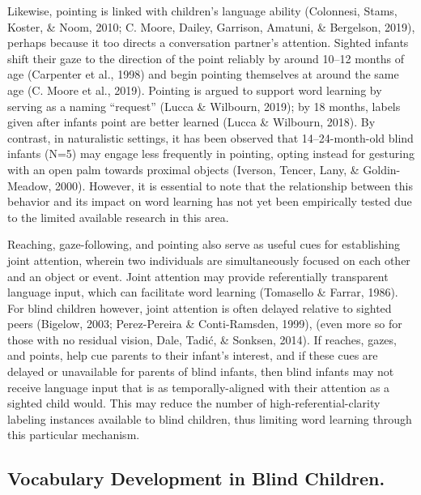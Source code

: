 \documentclass[
  man,floatsintext]{apa6}
\begin{document}
Likewise, pointing is linked with children's language ability (Colonnesi, Stams, Koster, \& Noom, 2010; C. Moore, Dailey, Garrison, Amatuni, \& Bergelson, 2019), perhaps because it too directs a conversation partner's attention. Sighted infants shift their gaze to the direction of the point reliably by around 10--12 months of age (Carpenter et al., 1998) and begin pointing themselves at around the same age (C. Moore et al., 2019). Pointing is argued to support word learning by serving as a naming ``request'' (Lucca \& Wilbourn, 2019); by 18 months, labels given after infants point are better learned (Lucca \& Wilbourn, 2018). By contrast, in naturalistic settings, it has been observed that 14--24-month-old blind infants (N=5) may engage less frequently in pointing, opting instead for gesturing with an open palm towards proximal objects (Iverson, Tencer, Lany, \& Goldin-Meadow, 2000). However, it is essential to note that the relationship between this behavior and its impact on word learning has not yet been empirically tested due to the limited available research in this area.

Reaching, gaze-following, and pointing also serve as useful cues for establishing joint attention, wherein two individuals are simultaneously focused on each other and an object or event. Joint attention may provide referentially transparent language input, which can facilitate word learning (Tomasello \& Farrar, 1986). For blind children however, joint attention is often delayed relative to sighted peers (Bigelow, 2003; Perez-Pereira \& Conti-Ramsden, 1999), (even more so for those with no residual vision, Dale, Tadić, \& Sonksen, 2014). If reaches, gazes, and points, help cue parents to their infant's interest, and if these cues are delayed or unavailable for parents of blind infants, then blind infants may not receive language input that is as temporally-aligned with their attention as a sighted child would. This may reduce the number of high-referential-clarity labeling instances available to blind children, thus limiting word learning through this particular mechanism.

\hypertarget{vocabulary-development-in-blind-children.}{%
\subsection{Vocabulary Development in Blind Children.}\label{vocabulary-development-in-blind-children.}}
\end{document}
